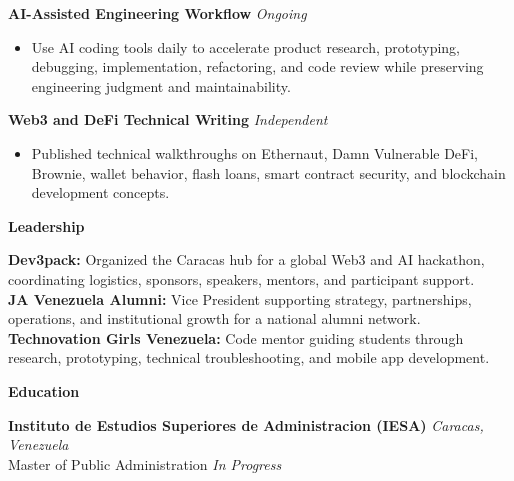 \documentclass[11pt]{article}
\begin{document}
\vspace{6pt}
\textbf{AI-Assisted Engineering Workflow} \hfill \textit{Ongoing}
\begin{itemize}
    \item Use AI coding tools daily to accelerate product research, prototyping, debugging, implementation, refactoring, and code review while preserving engineering judgment and maintainability.
\end{itemize}

\vspace{6pt}
\textbf{Web3 and DeFi Technical Writing} \hfill \textit{Independent}
\begin{itemize}
    \item Published technical walkthroughs on Ethernaut, Damn Vulnerable DeFi, Brownie, wallet behavior, flash loans, smart contract security, and blockchain development concepts.
\end{itemize}

\vspace{7pt}
\begin{center}
    \textbf{Leadership}
\end{center}
\vspace{-4pt}
\textbf{Dev3pack:} Organized the Caracas hub for a global Web3 and AI hackathon, coordinating logistics, sponsors, speakers, mentors, and participant support. \\
\textbf{JA Venezuela Alumni:} Vice President supporting strategy, partnerships, operations, and institutional growth for a national alumni network. \\
\textbf{Technovation Girls Venezuela:} Code mentor guiding students through research, prototyping, technical troubleshooting, and mobile app development.

\vspace{7pt}
\begin{center}
    \textbf{Education}
\end{center}
\vspace{-4pt}
\textbf{Instituto de Estudios Superiores de Administracion (IESA)} \hfill \textit{Caracas, Venezuela} \\
Master of Public Administration \hfill \textit{In Progress}
\end{document}

